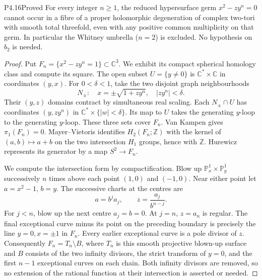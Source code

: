 \begin{statement}{P4.16}{Proved}
For every integer $n\geq1$, the reduced hypersurface germ
$x^2-zy^n=0$ cannot occur in a fibre of a proper holomorphic
degeneration of complex two-tori with smooth total threefold,
even with any positive common multiplicity on that germ.
In particular the Whitney umbrella ($n=2$) is excluded.
No hypothesis on $b_2$ is needed.
\end{statement}
\begin{proof}
Put $F_n=\{x^2-zy^n=1\}\subset\mathbb C^3$. We exhibit its
compact spherical homology class and compute its square.
The open subset $U=\{y\ne0\}$ is
$\mathbb C^*\times\mathbb C$ in coordinates $(y,x)$.
For $0<\delta<1$, take the two disjoint graph neighbourhoods
\[
 N_\pm:\quad x=\pm\sqrt{1+zy^n},\quad |zy^n|<\delta.
\]
Their $(y,z)$ domains contract by simultaneous real scaling.
Each $N_\pm\cap U$ has coordinates $(y,zy^n)$ in
$\mathbb C^*\times\{|w|<\delta\}$. Its map to $U$ takes
the generating $y$-loop to the generating $y$-loop. These three
sets cover $F_n$. Van Kampen gives $\pi_1(F_n)=0$.
Mayer--Vietoris identifies $H_2(F_n;\mathbb Z)$ with the
kernel of $(a,b)\mapsto a+b$ on the two intersection
$H_1$ groups, hence with $\mathbb Z$. Hurewicz represents its
generator by a map $S^2\to F_n$.

We compute the intersection form by compactification. Blow up
$\mathbb P^1_x\times\mathbb P^1_y$ successively $n$ times above
each point $(1,0)$ and $(-1,0)$. Near either point let
$a=x^2-1$, $b=y$. The successive charts at the centres are
\[
 a=b^j a_j,\qquad z=\frac{a_j}{b^{n-j}}.
\]
For $j<n$, blow up the next centre $a_j=b=0$.
At $j=n$, $z=a_n$ is regular. The final exceptional curve
minus its point on the preceding boundary is precisely the
line $y=0,x=\pm1$ in $F_n$. Every earlier exceptional curve
is a pole divisor of $z$. Consequently $F_n=T_n\setminus B$,
where $T_n$ is this smooth projective blown-up surface and
$B$ consists of the two infinity divisors, the strict transform
of $y=0$, and the first $n-1$ exceptional curves on each chain.
Both infinity divisors are removed, so no extension of the
rational function at their intersection is asserted or needed.


\end{proof}
